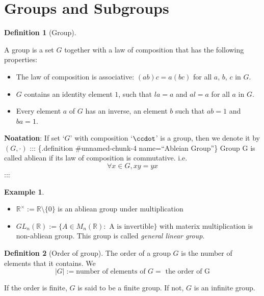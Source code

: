 \documentclass[
]{book}
\providecommand{\tightlist}{%
  \setlength{\itemsep}{0pt}\setlength{\parskip}{0pt}}
\theoremstyle{definition}
\newtheorem{definition}{Definition}[chapter]
\theoremstyle{definition}
\newtheorem{example}{Example}[chapter]
\theoremstyle{definition}
\theoremstyle{definition}
\theoremstyle{remark}
\begin{document}
\hypertarget{groups-and-subgroups}{%
\section{Groups and Subgroups}\label{groups-and-subgroups}}

\begin{definition}[Group]
\protect\hypertarget{def:unnamed-chunk-3}{}\label{def:unnamed-chunk-3}

A group is a set \(G\) together with a law of composition that has the following properties:

\begin{itemize}
\tightlist
\item
  The law of composition is associative: \((ab)c = a(bc)\) for all \(a\), \(b\), \(c\) in \(G\).
\item
  \(G\) contains an identity element \(1\), such that \(la = a\) and \(al = a\) for all \(a\) in \(G\).
\item
  Every element \(a\) of \(G\) has an inverse, an element \(b\) such that \(ab = 1\) and \(ba = 1\).
\end{itemize}

\end{definition}

\textbf{Noatation}: If set `\(G\)' with composition `\(\ccdot\)' is a group, then we denote it by \((G,\cdot)\)
::: \{.definition \#unnamed-chunk-4 name=``Ableian Group''\}
Group G is called abliean if its law of composition is commutative. i.e.
\[\forall x\in G, xy=yx\]
:::

\begin{example}
\protect\hypertarget{exm:unnamed-chunk-5}{}\label{exm:unnamed-chunk-5}\leavevmode

\begin{itemize}
\tightlist
\item
  \(\mathbb{R}^\times:=\mathbb{R}\setminus \{0\}\) is an abliean group under multiplication
\item
  \(GL_n(\mathbb{R}):=\{A\in M_n(\mathbb{R}): \text{ A is invertible}\}\) with materix multiplication is non-abliean group. This group is called \emph{general linear group}.
\end{itemize}

\end{example}

\begin{definition}[Order of group]
\protect\hypertarget{def:unnamed-chunk-6}{}\label{def:unnamed-chunk-6}The order of a group \(G\) is the number of elements that it contains. We \[| G | := \text{number of elements of }G=\text{ the order of G}\]

If the order is finite, \(G\) is said to be a finite group. If not, \(G\) is an infinite group.
\end{definition}
\end{document}
